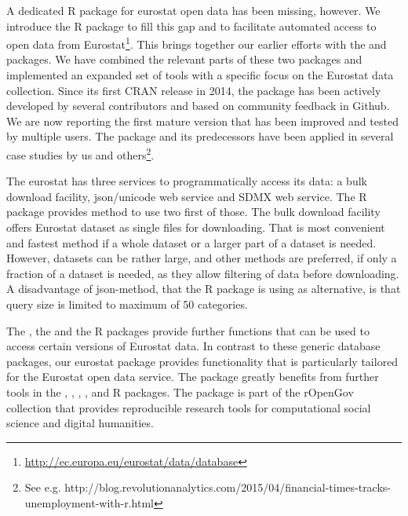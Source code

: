 A dedicated R package for eurostat open data has been missing,
however. We introduce the  R package to fill this
gap and to facilitate automated access to open data from
Eurostat\footnote{\url{http://ec.europa.eu/eurostat/data/database}}.
This brings together our earlier efforts with
the  \citep{statfi} and 
\citep{smarterpoland} packages. We have combined the
relevant parts of these two packages and implemented an expanded set
of tools with a specific focus on the Eurostat data collection. Since
its first CRAN release in 2014, the package has been actively
developed by several contributors and based on community feedback in
Github. We are now reporting the first mature version that has been
improved and tested by multiple users. The package and its
predecessors have been applied in several case studies by us and
others\footnote{See
e.g. http://blog.revolutionanalytics.com/2015/04/financial-times-tracks-unemployment-with-r.html}.

The eurostat has three services to programmatically access its data: a bulk
download facility, json/unicode web service and SDMX web service. 
The  R package provides method to use two first of those. 
The bulk download facility offers Eurostat dataset as single files for 
downloading. That is most convenient and fastest method if a whole dataset 
or a larger part of a dataset is needed. However, datasets can be rather 
large, and other methods are preferred, if only a fraction of a dataset is 
needed, as they allow filtering of data before downloading. A disadvantage 
of json-method, that the  R package is using as alternative, 
is that query size is limited to maximum of 50 categories. 

The  \citep{datamart}, the  \citep{quandl} and
the  \citep{pdfetch} 
R packages provide further functions that can be used to access
certain versions of Eurostat data. In contrast to these generic
database packages, our eurostat package provides functionality that is
particularly tailored for the Eurostat open data service.
The  package greatly benefits from further tools in
the
 \citep{dplyr},
 \citep{knitr},  \citep{ggplot2},
 \citep{mapproj}, and
 \citep{stringi} R packages. The  package is
part of the rOpenGov collection
\citep{Lahti13icml} that provides reproducible research tools for
computational social science and digital humanities.

